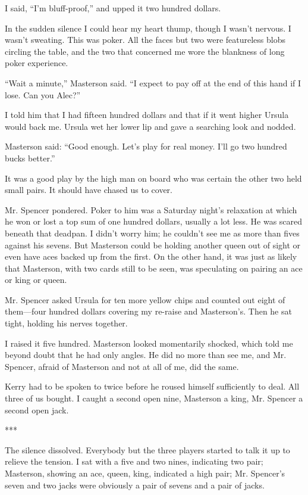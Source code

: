 \documentclass{novel}
\begin{document}
I said, “I’m bluff-proof,” and upped it two hundred dollars.

In the sudden silence I could hear my heart thump, though I wasn’t nervous. I wasn’t sweating. This was poker. All the faces but two were featureless blobs circling the table, and the two that concerned me wore the blankness of long poker experience.

“Wait a minute,” Masterson said. “I expect to pay off at the end of this hand if I lose. Can you Alec?”

I told him that I had fifteen hundred dollars and that if it went higher Ursula would back me. Ursula wet her lower lip and gave a searching look and nodded.

Masterson said: “Good enough. Let’s play for real money. I’ll go two hundred bucks better.”

It was a good play by the high man on board who was certain the other two held small pairs. It should have chased us to cover.

Mr. Spencer pondered. Poker to him was a Saturday night’s relaxation at which he won or lost a top sum of one hundred dollars, usually a lot less. He was scared beneath that deadpan. I didn’t worry him; he couldn’t see me as more than fives against his sevens. But Masterson could be holding another queen out of sight or even have aces backed up from the first. On the other hand, it was just as likely that Masterson, with two cards still to be seen, was speculating on pairing an ace or king or queen.

Mr. Spencer asked Ursula for ten more yellow chips and counted out eight of them—four hundred dollars covering my re-raise and Masterson’s. Then he sat tight, holding his nerves together.

I raised it five hundred. Masterson looked momentarily shocked, which told me beyond doubt that he had only angles. He did no more than see me, and Mr. Spencer, afraid of Masterson and not at all of me, did the same.

Kerry had to be spoken to twice before he roused himself sufficiently to deal. All three of us bought. I caught a second open nine, Masterson a king, Mr. Spencer a second open jack.

***

The silence dissolved. Everybody but the three players started to talk it up to relieve the tension. I sat with a five and two nines, indicating two pair; Masterson, showing an ace, queen, king, indicated a high pair; Mr. Spencer’s seven and two jacks were obviously a pair of sevens and a pair of jacks.
\end{document}
